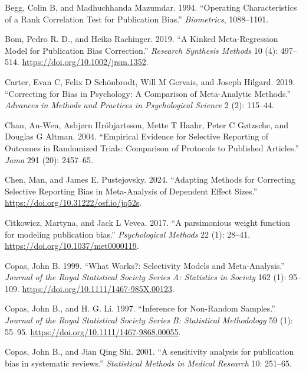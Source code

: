 \documentclass[
]{article}
\newlength{\cslhangindent}
\newenvironment{CSLReferences}[2] %
 {\begin{list}{}{%
  \setlength{\itemindent}{0pt}
  \setlength{\leftmargin}{0pt}
  \setlength{\parsep}{0pt}
  \ifodd #1
   \setlength{\leftmargin}{\cslhangindent}
   \setlength{\itemindent}{-1\cslhangindent}
  \fi
  \setlength{\itemsep}{#2\baselineskip}}}
 {\end{list}}
\begin{document}
\protect{}\label{refs}
\begin{CSLReferences}{1}{0}
Begg, Colin B, and Madhuchhanda Mazumdar. 1994. {``Operating
Characteristics of a Rank Correlation Test for Publication Bias.''}
\emph{Biometrics}, 1088--1101.

Bom, Pedro R. D., and Heiko Rachinger. 2019. {``A Kinked Meta-Regression
Model for Publication Bias Correction.''} \emph{Research Synthesis
Methods} 10 (4): 497--514. \url{https://doi.org/10.1002/jrsm.1352}.

Carter, Evan C, Felix D Schönbrodt, Will M Gervais, and Joseph Hilgard.
2019. {``Correcting for Bias in Psychology: A Comparison of
Meta-Analytic Methods.''} \emph{Advances in Methods and Practices in
Psychological Science} 2 (2): 115--44.

Chan, An-Wen, Asbjørn Hróbjartsson, Mette T Haahr, Peter C Gøtzsche, and
Douglas G Altman. 2004. {``Empirical Evidence for Selective Reporting of
Outcomes in Randomized Trials: Comparison of Protocols to Published
Articles.''} \emph{Jama} 291 (20): 2457--65.

Chen, Man, and James E. Pustejovsky. 2024. {``Adapting Methods for
Correcting Selective Reporting Bias in Meta-Analysis of Dependent Effect
Sizes.''} \url{https://doi.org/10.31222/osf.io/jq52s}.

Citkowicz, Martyna, and Jack L Vevea. 2017. {``{A parsimonious weight
function for modeling publication bias}.''} \emph{Psychological Methods}
22 (1): 28--41. \url{https://doi.org/10.1037/met0000119}.

Copas, John B. 1999. {``What Works?: {Selectivity} Models and
Meta-Analysis.''} \emph{Journal of the Royal Statistical Society Series
A: Statistics in Society} 162 (1): 95--109.
\url{https://doi.org/10.1111/1467-985X.00123}.

Copas, John B., and H. G. Li. 1997. {``Inference for Non-Random
Samples.''} \emph{Journal of the Royal Statistical Society Series B:
Statistical Methodology} 59 (1): 55--95.
\url{https://doi.org/10.1111/1467-9868.00055}.

Copas, John B., and Jian Qing Shi. 2001. {``{A sensitivity analysis for
publication bias in systematic reviews.}''} \emph{Statistical Methods in
Medical Research} 10: 251--65.


\end{CSLReferences}
\end{document}
